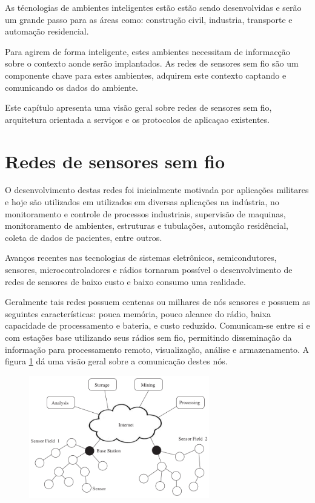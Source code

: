 As t\'ecnologias de ambientes inteligentes est\~ao est\~ao sendo desenvolvidas e ser\~ao um grande passo para as \'areas como: constru\c{c}\~ao civil, industria, transporte e automa\c{c}\~ao residencial.

Para agirem de forma inteligente, estes ambientes necessitam de informac\c{c}\~ao sobre o contexto aonde ser\~ao implantados. As redes de sensores sem fio s\~ao um componente chave para estes ambientes, adquirem este contexto captando e comunicando os dados do ambiente.\cite{lewis2004wireless}

Este cap\'itulo apresenta uma vis\~ao geral sobre redes de sensores sem fio, arquitetura orientada a servi\c{c}os e os protocolos de aplica\c{c}ao existentes.

\section{Redes de sensores sem fio}

O desenvolvimento destas redes foi inicialmente motivada por aplica\c{c}\~oes militares e hoje s\~ao utilizados em 
utilizados em diversas aplica\c{c}\~oes na ind\'ustria, no monitoramento e controle de processos industriais, supervis\~ao de maquinas, monitoramento de ambientes, estruturas e tubula\c{c}\~oes, autom\c{c}\~ao resid\^encial, coleta de dados de pacientes, entre outros.

Avan\c{c}os recentes nas tecnologias de sistemas eletr\^onicos, semicondutores, sensores, microcontroladores e r\'adios tornaram poss\'ivel o desenvolvimento de redes de sensores de baixo custo e baixo consumo uma realidade.

Geralmente tais redes possuem centenas ou milhares de n\'os sensores e possuem as seguintes caracter\'isticas: pouca mem\'oria, pouco alcance do r\'adio, baixa capacidade de processamento e bateria, e custo reduzido. Comunicam-se entre si e com esta\c{c}\~oes base utilizando seus r\'adios sem fio, permitindo dissemina\c{c}\~ao da informa\c{c}\~ao para processamento remoto, visualiza\c{c}\~ao, an\'alise e armazenamento. A figura \ref{wsnOverview} d\'a uma vis\~ao geral sobre a comunica\c{c}\~ao destes n\'os.

\begin{figure}[h]
   \label{wsnOverview}
   \centering
   \includegraphics[width=0.7\textwidth]{figuras/wsn.png}
   \caption{\cite{dargie2010fundamentals}}
\end{figure}


